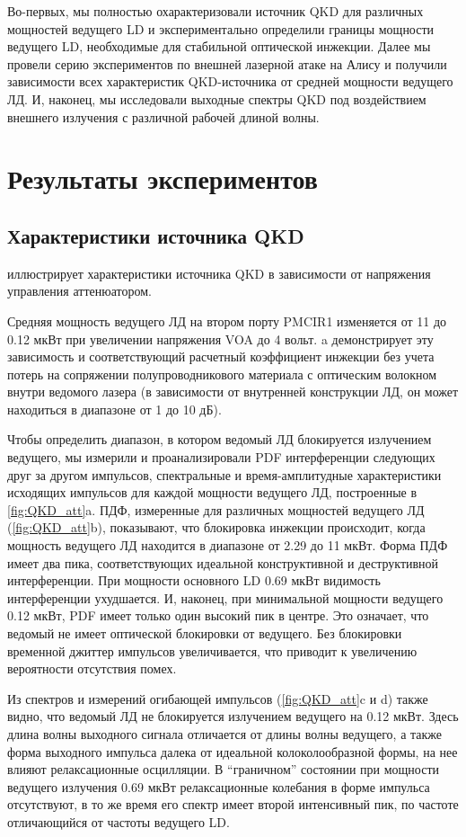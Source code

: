 Во-первых, мы полностью охарактеризовали источник QKD для различных мощностей ведущего LD и экспериментально определили границы мощности ведущего LD, необходимые для стабильной оптической инжекции. Далее мы провели серию экспериментов по внешней лазерной атаке на Алису и получили зависимости всех характеристик QKD-источника от средней мощности ведущего ЛД. И, наконец, мы исследовали выходные спектры QKD под воздействием внешнего излучения с различной рабочей длиной волны.
\section{Результаты экспериментов}
\label{sec:results}

\subsection{Характеристики источника QKD}

 иллюстрирует характеристики источника QKD в зависимости от напряжения управления аттенюатором.

Средняя мощность ведущего ЛД на втором порту PMCIR1 изменяется от 11 до 0.12 мкВт при увеличении напряжения VOA до 4 вольт. a демонстрирует эту зависимость и соответствующий расчетный коэффициент инжекции без учета потерь на сопряжении полупроводникового материала с оптическим волокном внутри ведомого лазера (в зависимости от внутренней конструкции ЛД, он может находиться в диапазоне от 1 до 10 дБ). 

Чтобы определить диапазон, в котором ведомый ЛД блокируется излучением ведущего, мы измерили и проанализировали PDF интерференции следующих друг за другом импульсов, спектральные и время-амплитудные характеристики исходящих импульсов для каждой мощности ведущего ЛД, построенные в \cref{fig:QKD_att}a. ПДФ, измеренные для различных мощностей ведущего ЛД (\cref{fig:QKD_att}b), показывают, что блокировка инжекции происходит, когда мощность ведущего ЛД находится в диапазоне от 2.29 до 11 мкВт.  Форма ПДФ имеет два пика, соответствующих идеальной конструктивной и деструктивной интерференции. При мощности основного LD 0.69 мкВт видимость интерференции ухудшается. И, наконец, при минимальной мощности ведущего 0.12 мкВт, PDF имеет только один высокий пик в центре. Это означает, что ведомый не имеет оптической блокировки от ведущего. Без блокировки временной джиттер импульсов увеличивается, что приводит к увеличению вероятности отсутствия помех.

Из спектров и измерений огибающей импульсов (\cref{fig:QKD_att}c и d) также видно, что ведомый ЛД не блокируется излучением ведущего на 0.12 мкВт. Здесь длина волны выходного сигнала отличается от длины волны ведущего, а также форма выходного импульса далека от идеальной колоколообразной формы, на нее влияют релаксационные осцилляции. В ``граничном'' состоянии при мощности ведущего излучения 0.69 мкВт релаксационные колебания в форме импульса отсутствуют, в то же время его спектр имеет второй интенсивный пик, по частоте отличающийся от частоты ведущего LD.

